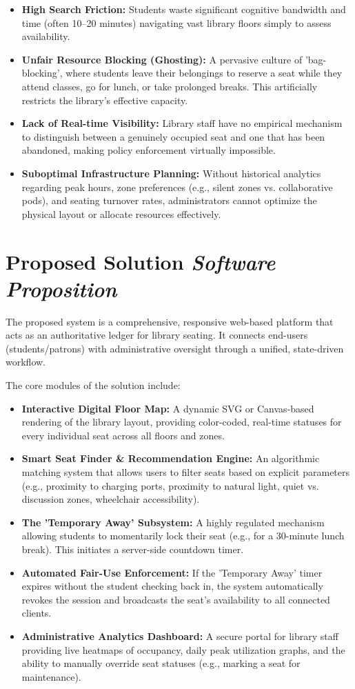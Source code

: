\documentclass[11pt,a4paper]{article}
\newcommand{\BvrHint}[1]{{\normalfont\normalsize\itshape\hfill #1}}
\begin{document}
\begin{itemize}[leftmargin=0.7cm]
    \item \textbf{High Search Friction:} Students waste significant cognitive bandwidth and time (often 10--20 minutes) navigating vast library floors simply to assess availability.
    \item \textbf{Unfair Resource Blocking (Ghosting):} A pervasive culture of 'bag-blocking', where students leave their belongings to reserve a seat while they attend classes, go for lunch, or take prolonged breaks. This artificially restricts the library's effective capacity.
    \item \textbf{Lack of Real-time Visibility:} Library staff have no empirical mechanism to distinguish between a genuinely occupied seat and one that has been abandoned, making policy enforcement virtually impossible.
    \item \textbf{Suboptimal Infrastructure Planning:} Without historical analytics regarding peak hours, zone preferences (e.g., silent zones vs. collaborative pods), and seating turnover rates, administrators cannot optimize the physical layout or allocate resources effectively.
\end{itemize}

\section{Proposed Solution \BvrHint{Software Proposition}}
The proposed system is a comprehensive, responsive web-based platform that acts as an authoritative ledger for library seating. It connects end-users (students/patrons) with administrative oversight through a unified, state-driven workflow.

The core modules of the solution include:
\begin{itemize}[leftmargin=0.7cm]
    \item \textbf{Interactive Digital Floor Map:} A dynamic SVG or Canvas-based rendering of the library layout, providing color-coded, real-time statuses for every individual seat across all floors and zones.
    \item \textbf{Smart Seat Finder \& Recommendation Engine:} An algorithmic matching system that allows users to filter seats based on explicit parameters (e.g., proximity to charging ports, proximity to natural light, quiet vs. discussion zones, wheelchair accessibility).
    \item \textbf{The 'Temporary Away' Subsystem:} A highly regulated mechanism allowing students to momentarily lock their seat (e.g., for a 30-minute lunch break). This initiates a server-side countdown timer.
    \item \textbf{Automated Fair-Use Enforcement:} If the 'Temporary Away' timer expires without the student checking back in, the system automatically revokes the session and broadcasts the seat's availability to all connected clients.
    \item \textbf{Administrative Analytics Dashboard:} A secure portal for library staff providing live heatmaps of occupancy, daily peak utilization graphs, and the ability to manually override seat statuses (e.g., marking a seat for maintenance).
\end{itemize}
\end{document}
